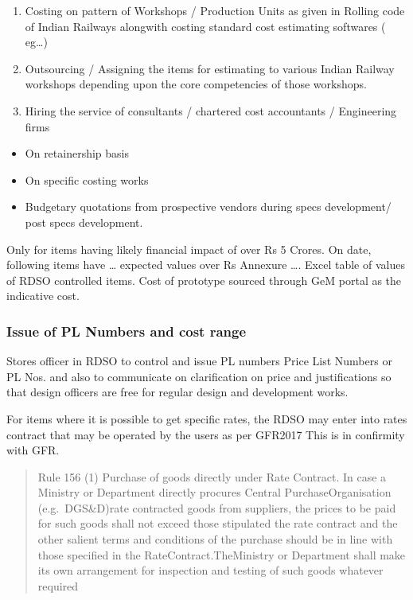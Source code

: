 \documentclass[
  10pt,
  twoside]{article}
\providecommand{\tightlist}{%
  \setlength{\itemsep}{0pt}\setlength{\parskip}{0pt}}
\begin{document}
\begin{enumerate}
\def\labelenumi{\arabic{enumi}.}
\item
  Costing on pattern of Workshops / Production Units as given in Rolling
  code of Indian Railways alongwith costing standard cost estimating
  softwares ( eg\ldots)
\item
  Outsourcing / Assigning the items for estimating to various Indian
  Railway workshops depending upon the core competencies of those
  workshops.
\item
  Hiring the service of consultants / chartered cost accountants /
  Engineering firms
\end{enumerate}

\begin{itemize}
\tightlist
\item
  On retainership basis
\item
  On specific costing works
\item
  Budgetary quotations from prospective vendors during specs
  development/ post specs development.
\end{itemize}

Only for items having likely financial impact of over Rs 5 Crores. On
date, following items have \ldots{} expected values over Rs Annexure
\ldots. Excel table of values of RDSO controlled items. Cost of
prototype sourced through GeM portal as the indicative cost.

\hypertarget{issue-of-pl-numbers-and-cost-range}{%
\subsubsection{Issue of PL Numbers and cost
range}\label{issue-of-pl-numbers-and-cost-range}}

Stores officer in RDSO to control and issue PL numbers Price List
Numbers or PL Nos. and also to communicate on clarification on price and
justifications so that design officers are free for regular design and
development works.

For items where it is possible to get specific rates, the RDSO may enter
into rates contract that may be operated by the users as per GFR2017
This is in confirmity with GFR.

\begin{quote}
Rule 156 (1) Purchase of goods directly under Rate Contract. In case a
Ministry or Department directly procures Central PurchaseOrganisation
(e.g.~DGS\&D)rate contracted goods from suppliers, the prices to be paid
for such goods shall not exceed those stipulated the rate contract and
the other salient terms and conditions of the purchase should be in line
with those specified in the RateContract.TheMinistry or Department shall
make its own arrangement for inspection and testing of such goods
whatever required
\end{quote}
\end{document}
